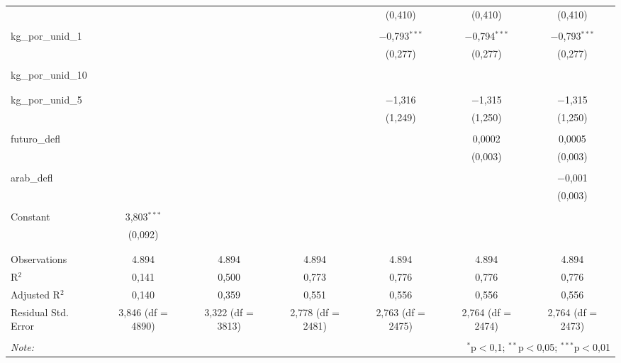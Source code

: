 \begin{table}[!htbp]
\begin{tabular}{@{\extracolsep{5pt}}lcccccc}
  &  &  &  & (0,410) & (0,410) & (0,410) \\ 
  & & & & & & \\ 
 kg\_por\_unid\_1 &  &  &  & $-$0,793$^{***}$ & $-$0,794$^{***}$ & $-$0,793$^{***}$ \\ 
  &  &  &  & (0,277) & (0,277) & (0,277) \\ 
  & & & & & & \\ 
 kg\_por\_unid\_10 &  &  &  &  &  &  \\ 
  &  &  &  &  &  &  \\ 
  & & & & & & \\ 
 kg\_por\_unid\_5 &  &  &  & $-$1,316 & $-$1,315 & $-$1,315 \\ 
  &  &  &  & (1,249) & (1,250) & (1,250) \\ 
  & & & & & & \\ 
 futuro\_defl &  &  &  &  & 0,0002 & 0,0005 \\ 
  &  &  &  &  & (0,003) & (0,003) \\ 
  & & & & & & \\ 
 arab\_defl &  &  &  &  &  & $-$0,001 \\ 
  &  &  &  &  &  & (0,003) \\ 
  & & & & & & \\ 
 Constant & 3,803$^{***}$ &  &  &  &  &  \\ 
  & (0,092) &  &  &  &  &  \\ 
  & & & & & & \\ 
\hline \\[-1.8ex] 
Observations & 4.894 & 4.894 & 4.894 & 4.894 & 4.894 & 4.894 \\ 
R$^{2}$ & 0,141 & 0,500 & 0,773 & 0,776 & 0,776 & 0,776 \\ 
Adjusted R$^{2}$ & 0,140 & 0,359 & 0,551 & 0,556 & 0,556 & 0,556 \\ 
Residual Std. Error & 3,846 (df = 4890) & 3,322 (df = 3813) & 2,778 (df = 2481) & 2,763 (df = 2475) & 2,764 (df = 2474) & 2,764 (df = 2473) \\ 
\hline 
\hline \\[-1.8ex] 
\textit{Note:}  & \multicolumn{6}{r}{$^{*}$p$<$0,1; $^{**}$p$<$0,05; $^{***}$p$<$0,01} \\ 
\end{tabular} 
\end{table} 
